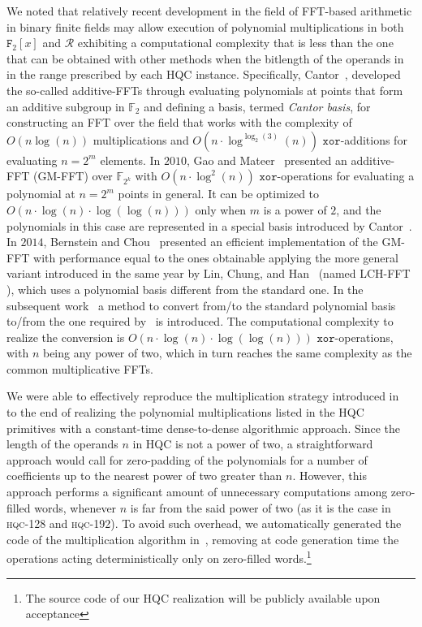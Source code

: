 We noted that relatively recent development in the field of FFT-based arithmetic 
in binary finite fields may allow execution of polynomial multiplications in 
both $\mathtt{F}_2[x]$ and $\mathcal{R}$ exhibiting a computational complexity 
that is less than the one that can be obtained with other methods when the 
bitlength of the operands in in the range prescribed by each HQC instance.
% 
Specifically, Cantor~\cite{DBLP:journals/jct/Cantor89}, developed the so-called 
additive-FFTs through evaluating polynomials at points that form an additive 
subgroup in $\mathbb{F}_2$ and defining a basis, termed {\em Cantor basis}, for 
constructing an FFT over the field that works with the complexity of 
$O(n \log(n))$ multiplications and 
$O(n\cdot\log^{\log_2 (3)}(n))$ $\mathtt{xor}$-additions for evaluating 
$n = 2^m$ elements. 
In $2010$, Gao and Mateer~\cite{DBLP:journals/tit/GaoM10} presented an 
additive-FFT (GM-FFT) over $\mathbb{F}_{2^k}$ with 
$O(n\cdot\log^2(n))$ $\mathtt{xor}$-operations for evaluating a polynomial at 
$n = 2^m $ points in general. 
It can be optimized to $O(n\cdot\log( n)\cdot\log (\log(n)))$ only when $m$ is 
a power of $2$, and the polynomials in this case are represented in a special 
basis introduced by Cantor~\cite{DBLP:journals/jct/Cantor89}. 
In $2014$, Bernstein and Chou~\cite{DBLP:conf/sacrypt/BernsteinC14} presented an 
efficient implementation of the GM-FFT with performance equal to the ones 
obtainable applying the more general variant introduced in the same year by 
Lin, Chung, and Han~\cite{DBLP:conf/focs/LinCH14} (named LCH-FFT ), which uses 
a polynomial basis different from the standard one. 
In the subsequent work~\cite{DBLP:journals/tit/LinAH16} a method to convert 
from/to the standard polynomial basis to/from the one required 
by~\cite{DBLP:journals/jct/Cantor89} is introduced. 
The computational complexity to realize the conversion is 
$O(n\cdot \log(n)\cdot \log(\log(n)))$ $\mathtt{xor}$-operations, with $n$ 
being any power of two, which in turn reaches the same complexity as the 
common multiplicative FFTs.

We were able to effectively reproduce the multiplication strategy introduced  
in~\cite{DBLP:conf/sacrypt/BernsteinC14} to the end of realizing the polynomial 
multiplications listed in the HQC primitives with a constant-time dense-to-dense
algorithmic approach.
Since the length of the operands $n$ in HQC is not a power of two, a 
straightforward approach would call for zero-padding of the polynomials 
for a number of coefficients up to the nearest power of two greater than $n$.
However, this approach performs a significant amount of unnecessary computations
among zero-filled words, whenever $n$ is far from the said power of two (as it
is the case in \textsc{hqc-128} and \textsc{hqc-192}).
To avoid such overhead, we automatically generated the code of the  
multiplication algorithm in~\cite{DBLP:conf/sacrypt/BernsteinC14}, removing at code
generation time the operations acting deterministically only on zero-filled words.\footnote{The source code of our HQC realization will be publicly available upon 
acceptance} 

